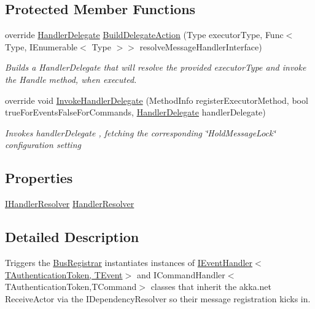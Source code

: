 \subsection*{Protected Member Functions}
\begin{DoxyCompactItemize}
\item 
override \hyperlink{classCqrs_1_1Configuration_1_1HandlerDelegate}{Handler\+Delegate} \hyperlink{classCqrs_1_1Akka_1_1Configuration_1_1AkkaBusRegistrar_ad7e3e5d332d5b4d781375a28f23bdb19_ad7e3e5d332d5b4d781375a28f23bdb19}{Build\+Delegate\+Action} (Type executor\+Type, Func$<$ Type, I\+Enumerable$<$ Type $>$$>$ resolve\+Message\+Handler\+Interface)
\begin{DoxyCompactList}\small\item\em Builds a Handler\+Delegate that will resolve the provided {\itshape executor\+Type}  and invoke the Handle method, when executed. \end{DoxyCompactList}\item 
override void \hyperlink{classCqrs_1_1Akka_1_1Configuration_1_1AkkaBusRegistrar_a0ac474751b2ba8ebb27b885a15fbf053_a0ac474751b2ba8ebb27b885a15fbf053}{Invoke\+Handler\+Delegate} (Method\+Info register\+Executor\+Method, bool true\+For\+Events\+False\+For\+Commands, \hyperlink{classCqrs_1_1Configuration_1_1HandlerDelegate}{Handler\+Delegate} handler\+Delegate)
\begin{DoxyCompactList}\small\item\em Invokes {\itshape handler\+Delegate} , fetching the corresponding \char`\"{}\+Hold\+Message\+Lock\char`\"{} configuration setting \end{DoxyCompactList}\end{DoxyCompactItemize}
\subsection*{Properties}
\begin{DoxyCompactItemize}
\item 
\hyperlink{interfaceCqrs_1_1Akka_1_1Configuration_1_1IHandlerResolver}{I\+Handler\+Resolver} \hyperlink{classCqrs_1_1Akka_1_1Configuration_1_1AkkaBusRegistrar_a642cd7215c2f51cfaff263f9ba95a4c4_a642cd7215c2f51cfaff263f9ba95a4c4}{Handler\+Resolver}
\end{DoxyCompactItemize}


\subsection{Detailed Description}
Triggers the \hyperlink{classCqrs_1_1Configuration_1_1BusRegistrar_a4a934d21a535b28af6c67154512bba20_a4a934d21a535b28af6c67154512bba20}{Bus\+Registrar} instantiates instances of \hyperlink{interfaceCqrs_1_1Events_1_1IEventHandler}{I\+Event\+Handler$<$\+T\+Authentication\+Token, T\+Event$>$} and I\+Command\+Handler$<$\+T\+Authentication\+Token,\+T\+Command$>$ classes that inherit the akka.\+net Receive\+Actor via the I\+Dependency\+Resolver so their message registration kicks in. 



